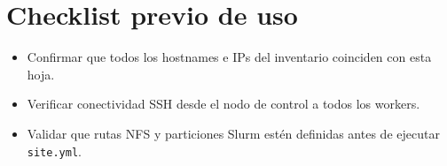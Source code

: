 \section*{Checklist previo de uso}

\begin{itemize}
  \item Confirmar que todos los hostnames e IPs del inventario coinciden con esta hoja.
  \item Verificar conectividad SSH desde el nodo de control a todos los workers.
  \item Validar que rutas NFS y particiones Slurm estén definidas antes de ejecutar \texttt{site.yml}.
\end{itemize}
